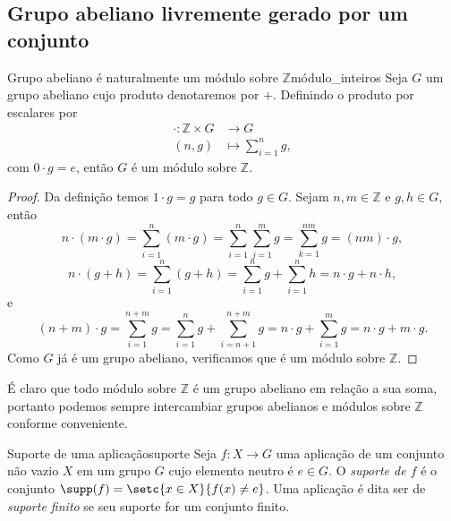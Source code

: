 \subsection{Grupo abeliano livremente gerado por um conjunto}
\begin{lemma}{Grupo abeliano é naturalmente um módulo sobre \(\mathbb{Z}\)}{módulo_inteiros}
    Seja \(G\) um grupo abeliano cujo produto denotaremos por \(+\). Definindo o produto por escalares por
    \begin{align*}
        \cdot : \mathbb{Z} \times G &\to G\\
                               (n,g)&\mapsto \sum_{i = 1}^n g,
    \end{align*}
    com \(0\cdot g = e\), então \(G\) é um módulo sobre \(\mathbb{Z}\).
\end{lemma}
\begin{proof}
    Da definição temos \(1\cdot g = g\) para todo \(g \in G\). Sejam \(n, m \in \mathbb{Z}\) e \(g, h \in G\), então
    \begin{equation*}
        n\cdot(m \cdot g) = \sum_{i = 1}^n (m \cdot g) = \sum_{i = 1}^n \sum_{j = 1}^m g = \sum_{k = 1}^{nm} g = (nm)\cdot g,
    \end{equation*}
    \begin{equation*}
        n\cdot(g + h) = \sum_{i = 1}^n (g + h) = \sum_{i = 1}^n g + \sum_{i = 1}^{n} h = n\cdot g + n \cdot h,
    \end{equation*}
    e
    \begin{equation*}
        (n + m)\cdot g = \sum_{i = 1}^{n + m} g = \sum_{i = 1}^n g + \sum_{i = n+1}^{n + m} g = n \cdot g + \sum_{i = 1}^m g = n\cdot g + m \cdot g.
    \end{equation*}
    Como \(G\) já é um grupo abeliano, verificamos que é um módulo sobre \(\mathbb{Z}\).
\end{proof}
\begin{remark}
    É claro que todo módulo sobre \(\mathbb{Z}\) é um grupo abeliano em relação a sua soma, portanto podemos sempre intercambiar grupos abelianos e módulos sobre \(\mathbb{Z}\) conforme conveniente.
\end{remark}

\begin{definition}{Suporte de uma aplicação}{suporte}
    Seja \(f : X \to G\) uma aplicação de um conjunto não vazio \(X\) em um grupo \(G\) cujo elemento neutro é \(e \in G\). O \emph{suporte de \(f\)} é o conjunto \(\supp(f) = \setc{x \in X}{f(x) \neq e}\). Uma aplicação é dita ser de \emph{suporte finito} se seu suporte for um conjunto finito.
\end{definition}

